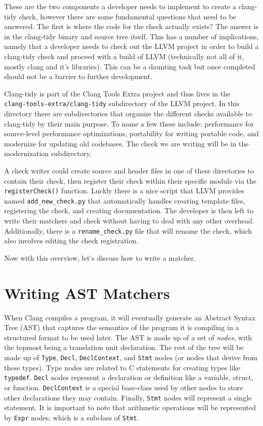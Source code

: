 These are the two components a developer needs to implement to create a clang-tidy check, however there are some fundamental questions that need to be answered. The first is where the code for the check actually exists? The answer is in the clang-tidy binary and source tree itself. This has a number of implications, namely that a developer needs to check out the LLVM project in order to build a clang-tidy check and proceed with a build of LLVM (technically not all of it, mostly clang and it's libraries). This can be a daunting task but once completed should not be a barrier to further development. 

Clang-tidy is part of the Clang Tools Extra project and thus lives in the \\ \texttt{clang-tools-extra/clang-tidy} subdirectory of the LLVM project. In this directory there are subdirectories that organize the different checks available to clang-tidy by their main purpose. To name a few these include: performance for source-level performance optimizations, portability for writing portable code, and modernize for updating old codebases. The check we are writing will be in the modernization subdirectory.

A check writer could create source and header files in one of these directories to contain their check, then register their check within their specific module via the \texttt{registerCheck()} function. Luckly there is a nice script that LLVM provides named \texttt{add\_new\_check.py} that automatically handles creating template files, registering the check, and creating documentation. The developer is then left to write their matchers and check without having to deal with any other overhead. Additionally, there is a \texttt{rename\_check.py} file that will rename the check, which also involves editing the check registration.

Now with this overview, let's discuss how to write a matcher.

\section{Writing AST Matchers}

When Clang compiles a program, it will eventually generate an Abstract Syntax Tree (AST) that captures the semantics of the program it is compiling in a structured format to be used later. The AST is made up of a set of \textit{nodes}, with the topmost being a translation unit declaration. The rest of the tree will be made up of \texttt{Type}, \texttt{Decl}, \texttt{DeclContext}, and \texttt{Stmt} nodes (or nodes that derive from these types). Type nodes are related to C statements for creating types like \texttt{typedef}. \texttt{Decl} nodes represent a declaration or definition like a variable, struct, or function. \texttt{DeclContext} is a special base-class used by other nodes to store other declarations they may contain. Finally, \texttt{Stmt} nodes will represent a single statement. It is important to note that arithmetic operations will be represented by \texttt{Expr} nodes, which is a subclass of \texttt{Stmt}.

